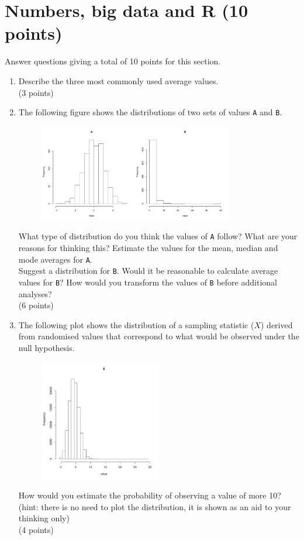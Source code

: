 \documentclass[11pt]{article}
\begin{document}
\section{Numbers, big data and R (10 points)}
Answer questions giving a total of 10 points for this section.
\begin{enumerate}
\item Describe the three most commonly used average values.\\
  (3 points)

\item The following figure shows the distributions of two sets of values \texttt{A}
  and \texttt{B}.
  \begin{figure}[H]
    \includegraphics[width=0.8\textwidth]{R/log_norm.pdf}
  \end{figure}
  What type of distribution do you think the values of \texttt{A} follow? What are your
  reasons for thinking this? Estimate the values for the mean, median and mode
  averages for \texttt{A}.\\
  Suggest a distribution for \texttt{B}. Would it be reasonable to calculate
  average values for \texttt{B}? How would you transform the values of
  \texttt{B} before additional analyses?\\
  (6 points)

\item The following plot shows the distribution of a sampling statistic ($X$)
  derived from randomised values that correspond to what would be observed
  under the null hypothesis. 
  \begin{figure}[H]
    \includegraphics[width=0.5\textwidth]{R/hyper}
  \end{figure}
  How would you estimate the probability of
  observing a value of more 10?\\
  (hint: there is no need to plot the distribution, it is shown as an aid to
  your thinking only)\\
  (4 points)


\end{enumerate}
\end{document}

